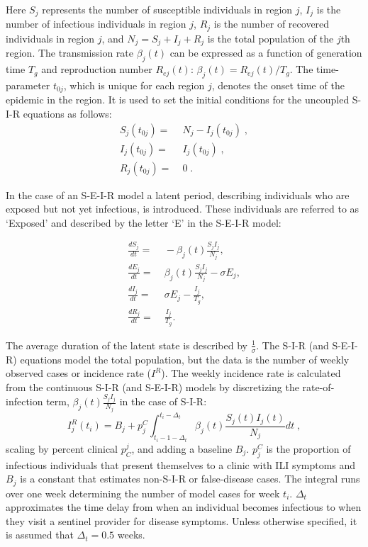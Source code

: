 \documentclass[a4paper]{article}
\begin{document}
Here $S_j$ represents the number of susceptible individuals in region $j$, $I_j$ is the number of infectious individuals in region $j$, $R_j$ is the number of recovered individuals in region $j$, and $N_{j}=S_j+I_j+R_j$ is the total population of the $j$th region.  The transmission rate $\beta_j(t)$ can be expressed as a function of generation time $T_g$ and reproduction number $R_{ej}(t)$: $\beta_j(t) = R_{ej}(t)/T_g$.  The time-parameter $t_{0j}$, which is unique for each region $j$, denotes the onset time of the epidemic in the region. It is used to set the initial conditions for the uncoupled S-I-R equations as follows:
\begin{align*}
  S_j(t_{0j}) =&\; N_{j}-I_j(t_{0j}) \;, \\
  I_j(t_{0j}) =&\; I_j(t_{0j}) \;, \\
  R_j(t_{0j}) =&\; 0 \;.
\end{align*}

In the case of an S-E-I-R model a latent period, describing individuals who are exposed but not yet infectious, is introduced. These individuals are referred to as `Exposed' and described by the letter `E' in the S-E-I-R model:

\begin{align}
\frac{dS_j}{dt} =&\; - \beta_j(t)\frac{S_j I_j}{N_{j}}, \label{eq:eqSEIR1} \\
\frac{dE_j}{dt} =&\;   \beta_j(t)\frac{S_j I_j}{N_{j}} - {\sigma}{E_j}, \label{eq:eqSEIR2} \\
\frac{dI_j}{dt} =&\;  {\sigma}{E_j} - \frac{I_j}{T_g},  \label{eq:eqSEIR3} \\
\frac{dR_j}{dt} =&\; \frac{I_j}{T_g}. \label{eq:eqSEIR4}
\end{align}

The average duration of the latent state is described by $\frac{1}{\sigma}$.
The S-I-R (and S-E-I-R) equations model the total population, but the data is the number of weekly observed cases or incidence rate ($I^R$).  The weekly incidence rate is calculated from the continuous S-I-R (and S-E-I-R) models by discretizing the rate-of-infection term, $\beta_j(t)\frac{S_j I_j}{N_j}$ in the case of S-I-R:
\begin{equation}
I_j^R(t_i) = B_j + p_j^C \int_{t_i-1-\Delta_t}^{t_i-\Delta_t} \beta_j(t)\frac{ S_j(t) I_j(t)}{N_j} dt\;,
\label{eq:Inc}
\end{equation}
scaling by percent clinical $p_C^j$, and adding a baseline $B_j$. $p_j^C$ is the proportion of infectious individuals that present themselves to a clinic with ILI symptoms and $B_j$ is a constant that estimates non-S-I-R or false-disease cases. The integral runs over one week determining the number of model cases for week $t_i$.  $\Delta_t$ approximates the time delay from when an individual becomes infectious to when they visit a sentinel provider for disease symptoms.  Unless otherwise specified, it is assumed that $\Delta_t=0.5$ weeks.
\end{document}
